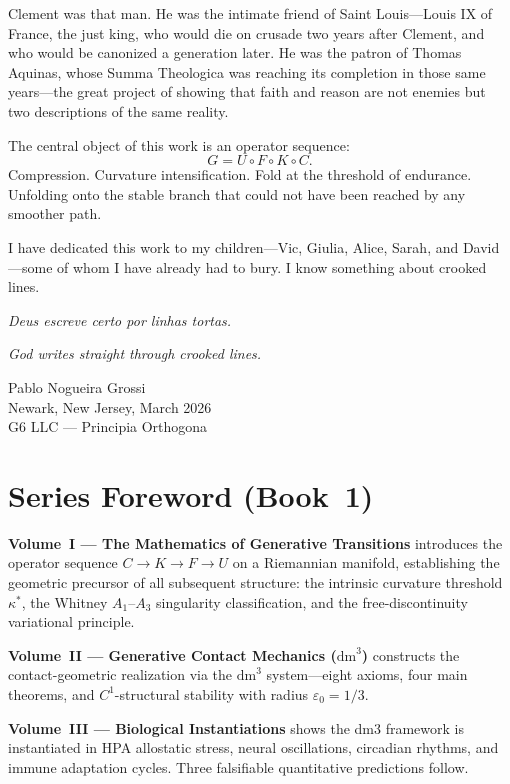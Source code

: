 \documentclass[11pt, twoside, openright]{book}
\theoremstyle{plain}
\theoremstyle{definition}
\newcommand{\dm}{\mathrm{dm}^3}
\newcommand{\eps}{\varepsilon_0}
\begin{document}
Clement was that man. He was the intimate friend of Saint Louis---Louis
IX of France, the just king, who would die on crusade two years after
Clement, and who would be canonized a generation later. He was the
patron of Thomas Aquinas, whose Summa Theologica was reaching its
completion in those same years---the great project of showing that faith
and reason are not enemies but two descriptions of the same reality.

The central object of this work is an operator sequence:
\[
G = U \circ F \circ K \circ C.
\]
Compression. Curvature intensification. Fold at the threshold of
endurance. Unfolding onto the stable branch that could not have been
reached by any smoother path.

I have dedicated this work to my children---Vic, Giulia, Alice, Sarah,
and David---some of whom I have already had to bury. I know something
about crooked lines.

\medskip
\textit{Deus escreve certo por linhas tortas.}

\textit{God writes straight through crooked lines.}

\begin{flushright}
Pablo Nogueira Grossi\\
Newark, New Jersey, March 2026\\
G6 LLC --- Principia Orthogona
\end{flushright}

\chapter*{Series Foreword (Book~1)}

\textbf{Volume~I --- The Mathematics of Generative Transitions}
introduces the operator sequence $C \to K \to F \to U$ on a Riemannian
manifold, establishing the geometric precursor of all subsequent
structure: the intrinsic curvature threshold $\kappa^*$, the Whitney
$A_1$--$A_3$ singularity classification, and the free-discontinuity
variational principle.

\textbf{Volume~II --- Generative Contact Mechanics ($\dm$)} constructs
the contact-geometric realization via the $\dm$ system---eight axioms,
four main theorems, and $C^1$-structural stability with radius
$\eps = 1/3$.

\textbf{Volume~III --- Biological Instantiations} shows the dm3
framework is instantiated in HPA allostatic stress, neural oscillations,
circadian rhythms, and immune adaptation cycles. Three falsifiable
quantitative predictions follow.
\end{document}
